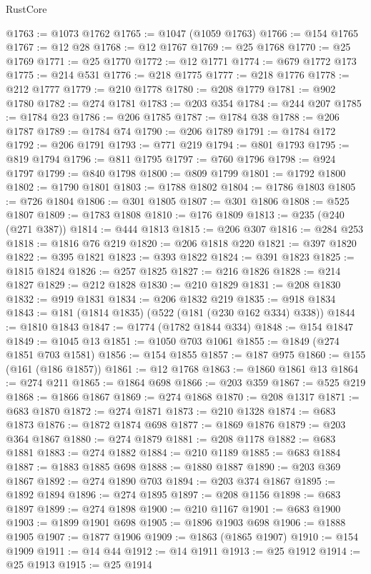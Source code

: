 \begin{lexlean}{RustCore}
\begin{coremodule}
@1763 := @1073 @1762
@1765 := @1047 (@1059 @1763)
@1766 := @154 @1765
@1767 := @12 @28
@1768 := @12 @1767
@1769 := @25 @1768
@1770 := @25 @1769
@1771 := @25 @1770
@1772 := @12 @1771
@1774 := @679 @1772 @173
@1775 := @214 @531
@1776 := @218 @1775
@1777 := @218 @1776
@1778 := @212 @1777
@1779 := @210 @1778
@1780 := @208 @1779
@1781 := @902 @1780
@1782 := @274 @1781
@1783 := @203 @354
@1784 := @244 @207
@1785 := @1784 @23
@1786 := @206 @1785
@1787 := @1784 @38
@1788 := @206 @1787
@1789 := @1784 @74
@1790 := @206 @1789
@1791 := @1784 @172
@1792 := @206 @1791
@1793 := @771 @219
@1794 := @801 @1793
@1795 := @819 @1794
@1796 := @811 @1795
@1797 := @760 @1796
@1798 := @924 @1797
@1799 := @840 @1798
@1800 := @809 @1799
@1801 := @1792 @1800
@1802 := @1790 @1801
@1803 := @1788 @1802
@1804 := @1786 @1803
@1805 := @726 @1804
@1806 := @301 @1805
@1807 := @301 @1806
@1808 := @525 @1807
@1809 := @1783 @1808
@1810 := @176 @1809
@1813 := @235 (@240 (@271 @387))
@1814 := @444 @1813
@1815 := @206 @307
@1816 := @284 @253
@1818 := @1816 @76 @219
@1820 := @206 @1818 @220
@1821 := @397 @1820
@1822 := @395 @1821
@1823 := @393 @1822
@1824 := @391 @1823
@1825 := @1815 @1824
@1826 := @257 @1825
@1827 := @216 @1826
@1828 := @214 @1827
@1829 := @212 @1828
@1830 := @210 @1829
@1831 := @208 @1830
@1832 := @919 @1831
@1834 := @206 @1832 @219
@1835 := @918 @1834
@1843 := @181 (@1814 @1835) (@522 (@181 (@230 @162 @334) @338))
@1844 := @1810 @1843
@1847 := @1774 (@1782 @1844 @334)
@1848 := @154 @1847
@1849 := @1045 @13
@1851 := @1050 @703 @1061
@1855 := @1849 (@274 @1851 @703 @1581)
@1856 := @154 @1855
@1857 := @187 @975
@1860 := @155 (@161 (@186 @1857))
@1861 := @12 @1768
@1863 := @1860 @1861 @13
@1864 := @274 @211
@1865 := @1864 @698
@1866 := @203 @359
@1867 := @525 @219
@1868 := @1866 @1867
@1869 := @274 @1868
@1870 := @208 @1317
@1871 := @683 @1870
@1872 := @274 @1871
@1873 := @210 @1328
@1874 := @683 @1873
@1876 := @1872 @1874 @698
@1877 := @1869 @1876
@1879 := @203 @364 @1867
@1880 := @274 @1879
@1881 := @208 @1178
@1882 := @683 @1881
@1883 := @274 @1882
@1884 := @210 @1189
@1885 := @683 @1884
@1887 := @1883 @1885 @698
@1888 := @1880 @1887
@1890 := @203 @369 @1867
@1892 := @274 @1890 @703
@1894 := @203 @374 @1867
@1895 := @1892 @1894
@1896 := @274 @1895
@1897 := @208 @1156
@1898 := @683 @1897
@1899 := @274 @1898
@1900 := @210 @1167
@1901 := @683 @1900
@1903 := @1899 @1901 @698
@1905 := @1896 @1903 @698
@1906 := @1888 @1905
@1907 := @1877 @1906
@1909 := @1863 (@1865 @1907)
@1910 := @154 @1909
@1911 := @14 @44
@1912 := @14 @1911
@1913 := @25 @1912
@1914 := @25 @1913
@1915 := @25 @1914

\end{coremodule}
\end{lexlean}
